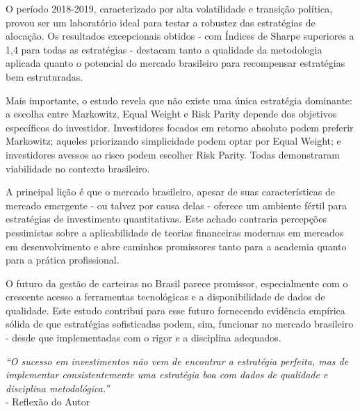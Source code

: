 O período 2018-2019, caracterizado por alta volatilidade e transição política, provou ser um laboratório ideal para testar a robustez das estratégias de alocação. Os resultados excepcionais obtidos - com Índices de Sharpe superiores a 1,4 para todas as estratégias - destacam tanto a qualidade da metodologia aplicada quanto o potencial do mercado brasileiro para recompensar estratégias bem estruturadas.

Mais importante, o estudo revela que não existe uma única estratégia dominante: a escolha entre Markowitz, Equal Weight e Risk Parity depende dos objetivos específicos do investidor. Investidores focados em retorno absoluto podem preferir Markowitz; aqueles priorizando simplicidade podem optar por Equal Weight; e investidores avessos ao risco podem escolher Risk Parity. Todas demonstraram viabilidade no contexto brasileiro.

A principal lição é que o mercado brasileiro, apesar de suas características de mercado emergente - ou talvez por causa delas - oferece um ambiente fértil para estratégias de investimento quantitativas. Este achado contraria percepções pessimistas sobre a aplicabilidade de teorias financeiras modernas em mercados em desenvolvimento e abre caminhos promissores tanto para a academia quanto para a prática profissional.

O futuro da gestão de carteiras no Brasil parece promissor, especialmente com o crescente acesso a ferramentas tecnológicas e a disponibilidade de dados de qualidade. Este estudo contribui para esse futuro fornecendo evidência empírica sólida de que estratégias sofisticadas podem, sim, funcionar no mercado brasileiro - desde que implementadas com o rigor e a disciplina adequados.

\vspace{1cm}

\textit{``O sucesso em investimentos não vem de encontrar a estratégia perfeita, mas de implementar consistentemente uma estratégia boa com dados de qualidade e disciplina metodológica.''} \\
\hfill - Reflexão do Autor